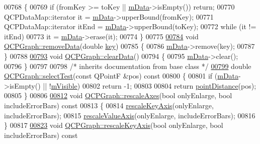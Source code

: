 \begin{DoxyCode}
00768 \{
00769   \textcolor{keywordflow}{if} (fromKey >= toKey || \hyperlink{a00031_a8457c840f69a0ac49f61d30a509c5d08}{mData}->isEmpty()) \textcolor{keywordflow}{return};
00770   QCPDataMap::iterator it = \hyperlink{a00031_a8457c840f69a0ac49f61d30a509c5d08}{mData}->upperBound(fromKey);
00771   QCPDataMap::iterator itEnd = \hyperlink{a00031_a8457c840f69a0ac49f61d30a509c5d08}{mData}->upperBound(toKey);
00772   \textcolor{keywordflow}{while} (it != itEnd)
00773     it = \hyperlink{a00031_a8457c840f69a0ac49f61d30a509c5d08}{mData}->erase(it);
00774 \}
00775 
\hypertarget{a00115_source_l00784}{}\hyperlink{a00031_a4a706020b4318f118381648ef18aca3f}{00784} \textcolor{keywordtype}{void} \hyperlink{a00031_a4a0fde50b7db9db0a85b5c5b6b10098f}{QCPGraph::removeData}(\textcolor{keywordtype}{double} \hyperlink{a00116_a94bb892c30911cd62cba0707a5395be4}{key})
00785 \{
00786   \hyperlink{a00031_a8457c840f69a0ac49f61d30a509c5d08}{mData}->remove(key);
00787 \}
00788 
\hypertarget{a00115_source_l00793}{}\hyperlink{a00031_ad4e94a4e44e5e76fbec81a72a977157d}{00793} \textcolor{keywordtype}{void} \hyperlink{a00031_ad4e94a4e44e5e76fbec81a72a977157d}{QCPGraph::clearData}()
00794 \{
00795   \hyperlink{a00031_a8457c840f69a0ac49f61d30a509c5d08}{mData}->clear();
00796 \}
00797 
00798 \textcolor{comment}{/* inherits documentation from base class */}
\hypertarget{a00115_source_l00799}{}\hyperlink{a00031_a9a95048dc6daf83e45efbf6d2cdc92d7}{00799} \textcolor{keywordtype}{double} \hyperlink{a00031_a9a95048dc6daf83e45efbf6d2cdc92d7}{QCPGraph::selectTest}(\textcolor{keyword}{const} QPointF &pos)\textcolor{keyword}{ const}
00800 \textcolor{keyword}{}\{
00801   \textcolor{keywordflow}{if} (\hyperlink{a00031_a8457c840f69a0ac49f61d30a509c5d08}{mData}->isEmpty() || !\hyperlink{a00044_a62e3aed8427d6ce3ccf716f285106cb3}{mVisible})
00802     \textcolor{keywordflow}{return} -1;
00803   
00804   \textcolor{keywordflow}{return} \hyperlink{a00031_af93762a12a481a7edb4b3dd9e330dff1}{pointDistance}(pos);
00805 \}
00806 
\hypertarget{a00115_source_l00812}{}\hyperlink{a00031_aa35b75b9032800d783df749c8a004ee9}{00812} \textcolor{keywordtype}{void} \hyperlink{a00031_aa35b75b9032800d783df749c8a004ee9}{QCPGraph::rescaleAxes}(\textcolor{keywordtype}{bool} onlyEnlarge, \textcolor{keywordtype}{bool} includeErrorBars)\textcolor{keyword}{ const}
00813 \textcolor{keyword}{}\{
00814   \hyperlink{a00031_a2108a729046b0ab6e0516afb249dab13}{rescaleKeyAxis}(onlyEnlarge, includeErrorBars);
00815   \hyperlink{a00031_a2ba0e1df416486d7e74299ef8cf68bba}{rescaleValueAxis}(onlyEnlarge, includeErrorBars);
00816 \}
00817 
\hypertarget{a00115_source_l00823}{}\hyperlink{a00031_a2108a729046b0ab6e0516afb249dab13}{00823} \textcolor{keywordtype}{void} \hyperlink{a00031_a2108a729046b0ab6e0516afb249dab13}{QCPGraph::rescaleKeyAxis}(\textcolor{keywordtype}{bool} onlyEnlarge, \textcolor{keywordtype}{bool} includeErrorBars)\textcolor{keyword}{ const}

\end{DoxyCode}
